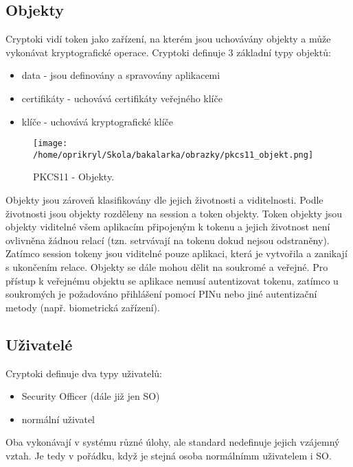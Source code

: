 \documentclass[]{fithesis3}
\begin{document}
		\subsection{Objekty}

		Cryptoki vidí token jako zařízení, na kterém jsou uchovávány objekty a může vykonávat 			kryptografické operace. Cryptoki definuje 3 základní typy objektů:
		\begin{itemize}
			\item data - jsou definovány a spravovány aplikacemi
			\item certifikáty - uchovává certifikáty veřejného klíče
			\item klíče - uchovává kryptografické klíče
		\end{itemize}

		\begin{figure}[!ht]
  			\begin{minipage}{1.00\textwidth}
    				\texttt{[image: /home/oprikryl/Skola/bakalarka/obrazky/pkcs11\_objekt.png]}
  			\end{minipage}
 			\caption{PKCS11 - Objekty.}
  			\label{fig:PKCS11 - Objekty.}
		\end{figure}

		Objekty jsou zároveň klasifikovány dle jejich životnosti a viditelnosti. Podle životnosti jsou 			objekty rozděleny na session a token objekty. Token objekty jsou objekty viditelné všem 			aplikacím připojeným k tokenu a jejich životnost není ovlivněna žádnou relací (tzn. 					setrvávají na tokenu dokud nejsou odstraněny). Zatímco session tokeny jsou viditelné 				pouze aplikaci, která je vytvořila a zanikají s ukončením relace.
		Objekty se dále mohou dělit na soukromé a veřejné. Pro přístup k veřejnému objektu se 			aplikace nemusí autentizovat tokenu, zatímco u soukromých je požadováno přihlášení 				pomocí PINu nebo jiné autentizační metody (např. biometrická zařízení).

		\subsection{Uživatelé}

		Cryptoki definuje dva typy uživatelů: 
		\begin{itemize}
			\item Security Officer (dále již jen SO) 
			\item normální uživatel
		\end{itemize}
		Oba vykonávají v systému různé úlohy, ale standard nedefinuje jejich vzájemný vztah. Je 			tedy v pořádku, když je stejná osoba normálnímm uživatelem i SO.
\end{document}

